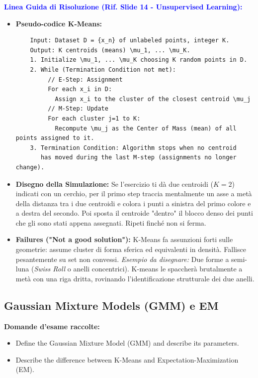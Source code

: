 \documentclass[11pt,a4paper]{article}
\begin{document}
\textbf{\textcolor{blue}{Linea Guida di Risoluzione (Rif. Slide 14 - Unsupervised Learning):}}
\begin{itemize}
    \item \textbf{Pseudo-codice K-Means:}
    \begin{verbatim}
    Input: Dataset D = {x_n} of unlabeled points, integer K.
    Output: K centroids (means) \mu_1, ... \mu_K.
    1. Initialize \mu_1, ... \mu_K choosing K random points in D.
    2. While (Termination Condition not met):
         // E-Step: Assignment
         For each x_i in D: 
           Assign x_i to the cluster of the closest centroid \mu_j
         // M-Step: Update
         For each cluster j=1 to K:
           Recompute \mu_j as the Center of Mass (mean) of all points assigned to it.
    3. Termination Condition: Algorithm stops when no centroid 
       has moved during the last M-step (assignments no longer change).
    \end{verbatim}
    \item \textbf{Disegno della Simulazione:} Se l'esercizio ti dà due centroidi ($K=2$) indicati con un cerchio, per il primo step traccia mentalmente un asse a metà della distanza tra i due centroidi e colora i punti a sinistra del primo colore e a destra del secondo. Poi sposta il centroide "dentro" il blocco denso dei punti che gli sono stati appena assegnati. Ripeti finché non si ferma.
    \item \textbf{Failures ("Not a good solution"):} K-Means fa assunzioni forti sulle geometrie: assume cluster di forma sferica ed equivalenti in densità. Fallisce pesantemente su set non convessi. \textit{Esempio da disegnare:} Due forme a semi-luna (\textit{Swiss Roll} o anelli concentrici). K-means le spaccherà brutalmente a metà con una riga dritta, rovinando l'identificazione strutturale dei due anelli.
\end{itemize}

\subsection{Gaussian Mixture Models (GMM) e EM}
\textbf{Domande d'esame raccolte:}
\begin{itemize}
    \item Define the Gaussian Mixture Model (GMM) and describe its parameters.
    \item Describe the difference between K-Means and Expectation-Maximization (EM).
\end{itemize}
\end{document}
